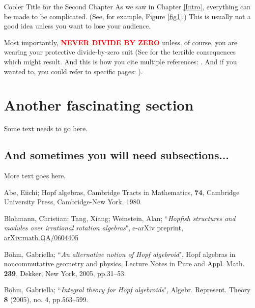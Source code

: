 \documentclass[12pt]{pom_thesis}
\begin{document}
\begin{chapter}{Cooler Title for the Second Chapter} As we saw in Chapter \ref{Intro}, everything can be
made to be complicated. (See, for example,  Figure \ref{fig1}.) This is usually not a good idea unless you want to lose your audience.



Most importantly, \textcolor{red}{\bf NEVER DIVIDE BY ZERO} unless, of course, you are wearing your protective
divide-by-zero suit (See \cite{Ab80} for the terrible consequences which might result. And this is how you cite multiple references: \cite{Ab80, BlTaWe, Bo1}. And if you wanted to, you could refer to specific pages: \cite[pages 567--569]{Bo2}).

\section{Another fascinating section}

Some text needs to go here.

\subsection{And sometimes you will need subsections...}

More text goes here.

\end{chapter}


\begin{thebibliography}{99}

 Abe, Eiichi; Hopf algebras, Cambridge Tracts in
Mathematics, \textbf{74}, Cambridge University Press, Cambridge-New York,
1980.

 Blohmann, Christian; Tang, Xiang; Weinstein, Alan;
``\textit{Hopfish structures and modules over irrational rotation algebras}",
e-arXiv preprint,
\href{http://arxiv.org/abs/math/0604405}{arXiv:math.QA/0604405}


 B\"{o}hm, Gabriella; ``\textit{An alternative notion of Hopf
algebroid}", Hopf algebras in noncommutative geometry and physics, Lecture
Notes in Pure and Appl. Math. \textbf{239}, Dekker, New York, 2005, pp.31--53.


 B\"{o}hm, Gabriella; ``\textit{Integral theory for Hopf
algebroids}", Algebr. Represent. Theory \textbf{8} (2005), no. 4, pp.563--599.


\end{thebibliography}
\end{document}
